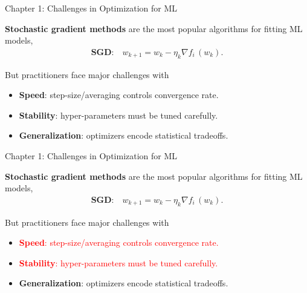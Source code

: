 \documentclass[mathserif,notheorems, hyperref={colorlinks, citecolor=blue, urlcolor=blue, linkcolor=blue}]{beamer}
\def\\{}%
\begin{document}
    \begin{frame}{Chapter 1: Challenges in Optimization for ML}

        \textbf{Stochastic gradient methods} are the most popular algorithms for fitting ML models,
        \begin{align*}
            \textbf{SGD:} \quad w_{k + 1} = w_k - \eta_k \nabla f_i \, (w_k). \\
        \end{align*}


        But practitioners face major challenges with \vspace{0.5em}
        \begin{itemize}
            \item \textbf{Speed}: step-size/averaging controls convergence rate.
            \item \textbf{Stability}: hyper-parameters must be tuned carefully.
            \item \textbf{Generalization}: optimizers encode statistical tradeoffs.
        \end{itemize}
        \vspace{1em}

    \end{frame}


    \begin{frame}{Chapter 1: Challenges in Optimization for ML}

        \textbf{Stochastic gradient methods} are the most popular algorithms for fitting ML models,
        \begin{align*}
            \textbf{SGD:} \quad w_{k + 1} = w_k - \eta_k \nabla f_i \, (w_k). \\
        \end{align*}


        But practitioners face major challenges with \vspace{0.5em}
        \begin{itemize}
            \item \textcolor{red}{\textbf{Speed}: step-size/averaging controls convergence rate.}
            \item \textcolor{red}{\textbf{Stability}: hyper-parameters must be tuned carefully.}
            \item \textbf{Generalization}: optimizers encode statistical tradeoffs.
        \end{itemize}
        \vspace{1em}

    \end{frame}
\end{document}
